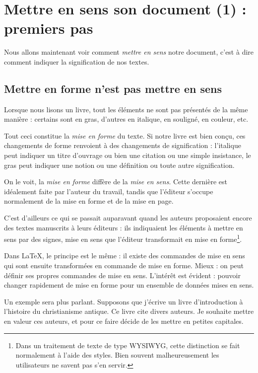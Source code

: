 \chapter{Mettre en sens son document (1) : premiers pas}

\begin{prealable}
    Nous allons maintenant voir comment \emph{mettre en sens} notre document, c'est à dire comment indiquer  la signification de nos textes.
\end{prealable}

\section{Mettre en forme n'est pas mettre en sens}\label{sensforme}

Lorsque nous lisons un livre, tout les éléments ne sont pas présentés de la même manière : certains sont en gras, d'autres en italique, en souligné, en couleur, etc. 

Tout ceci constitue la \emph{mise en forme} du texte. Si notre livre est bien conçu, ces changements de forme renvoient à des changements de signification : l'italique peut indiquer un titre d'ouvrage ou bien une citation ou une simple insistance, le gras peut indiquer une notion ou une définition ou toute autre signification.

On le voit, la \emph{mise en forme} diffère de la \emph{mise en sens}. Cette dernière est idéalement faite par l'auteur du travail, tandis que l'éditeur s'occupe normalement de la mise en forme et de la mise en page.

C'est d'ailleurs ce qui se passait auparavant quand les auteurs proposaient encore des textes manuscrits à leurs éditeurs : ils indiquaient les éléments à mettre en sens par des signes, mise en sens que l'éditeur transformait en mise en forme\footnote{Dans un traitement de texte de type WYSIWYG, cette distinction se fait normalement à l'aide des styles. Bien souvent malheureusement les utilisateurs ne savent pas s'en servir.}.

Dans \LaTeX, le principe est le même : il existe des commandes de mise en sens qui sont ensuite transformées en commande de mise en forme. Mieux : on peut définir ses propres commandes de mise en sens. L'intérêt est  évident : pouvoir changer rapidement de mise en forme pour un ensemble de données mises en sens.

Un exemple sera plus parlant. Supposons que j'écrive un livre d'introduction à l'histoire du christianisme antique. Ce livre cite divers auteurs. Je souhaite mettre en valeur ces auteurs, et pour ce faire décide de les mettre en petites capitales.

